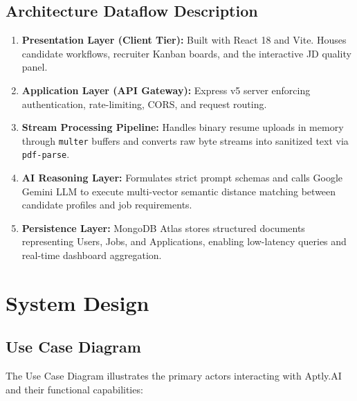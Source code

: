 \documentclass[12pt, a4paper]{article}
\begin{document}
\subsection{Architecture Dataflow Description}
\begin{enumerate}[label=\textbf{\arabic*.}]
    \item \textbf{Presentation Layer (Client Tier):} Built with React 18 and Vite. Houses candidate workflows, recruiter Kanban boards, and the interactive JD quality panel.
    \item \textbf{Application Layer (API Gateway):} Express v5 server enforcing authentication, rate-limiting, CORS, and request routing.
    \item \textbf{Stream Processing Pipeline:} Handles binary resume uploads in memory through \texttt{multer} buffers and converts raw byte streams into sanitized text via \texttt{pdf-parse}.
    \item \textbf{AI Reasoning Layer:} Formulates strict prompt schemas and calls Google Gemini LLM to execute multi-vector semantic distance matching between candidate profiles and job requirements.
    \item \textbf{Persistence Layer:} MongoDB Atlas stores structured documents representing Users, Jobs, and Applications, enabling low-latency queries and real-time dashboard aggregation.
\end{enumerate}

\newpage

\section{System Design}

\subsection{Use Case Diagram}
The Use Case Diagram illustrates the primary actors interacting with Aptly.AI and their functional capabilities:
\end{document}
